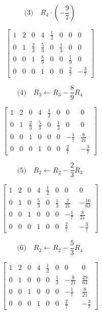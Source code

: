 \documentclass[12pt,a4paper]{article}
\begin{document}
\[ \text{(3)}\quad R_4 \cdot \left(-\frac{9}{7}\right) \]



\[
\left[
\begin{array}{cccc|cccc}
1 & 2 & 0 & 4 & \tfrac12 & 0 & 0 & 0 \\
0 & 1 & \tfrac{2}{3} & \tfrac{5}{3} & 0 & \tfrac13 & 0 & 0 \\
0 & 0 & 1 & \tfrac{8}{9} & 0 & 0 & \tfrac19 & 0 \\
0 & 0 & 0 & 1 & 0 & 0 & \tfrac{2}{7} & -\tfrac{3}{7}
\end{array}
\right]
\]



\[ \text{(4)}\quad R_3 \leftarrow R_3 - \frac{8}{9}R_4 \]



\[
\left[
\begin{array}{cccc|cccc}
1 & 2 & 0 & 4 & \tfrac12 & 0 & 0 & 0 \\
0 & 1 & \tfrac{2}{3} & \tfrac{5}{3} & 0 & \tfrac13 & 0 & 0 \\
0 & 0 & 1 & 0 & 0 & 0 & -\tfrac{1}{7} & \tfrac{8}{21} \\
0 & 0 & 0 & 1 & 0 & 0 & \tfrac{2}{7} & -\tfrac{3}{7}
\end{array}
\right]
\]



\[ \text{(5)}\quad R_2 \leftarrow R_2 - \frac{2}{3}R_3 \]



\[
\left[
\begin{array}{cccc|cccc}
1 & 2 & 0 & 4 & \tfrac12 & 0 & 0 & 0 \\
0 & 1 & 0 & \tfrac{5}{3} & 0 & \tfrac13 & \tfrac{2}{21} & -\tfrac{16}{63} \\
0 & 0 & 1 & 0 & 0 & 0 & -\tfrac{1}{7} & \tfrac{8}{21} \\
0 & 0 & 0 & 1 & 0 & 0 & \tfrac{2}{7} & -\tfrac{3}{7}
\end{array}
\right]
\]



\[ \text{(6)}\quad R_2 \leftarrow R_2 - \frac{5}{3}R_4 \]



\[
\left[
\begin{array}{cccc|cccc}
1 & 2 & 0 & 4 & \tfrac12 & 0 & 0 & 0 \\
0 & 1 & 0 & 0 & 0 & \tfrac13 & -\tfrac{8}{21} & \tfrac{29}{63} \\
0 & 0 & 1 & 0 & 0 & 0 & -\tfrac{1}{7} & \tfrac{8}{21} \\
0 & 0 & 0 & 1 & 0 & 0 & \tfrac{2}{7} & -\tfrac{3}{7}
\end{array}
\right]
\]
\end{document}
